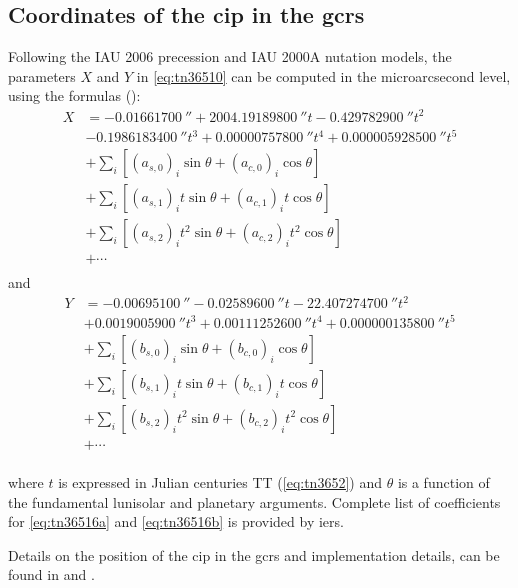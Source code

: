 \subsection{Coordinates of the \gls{cip} in the \gls{gcrs}}
\label{ssec:coordinates-of-the-cip-in-the-gcrs}
Following the IAU 2006 precession and IAU 2000A nutation models, the parameters 
\(X\) and \(Y\) in \ref{eq:tn36510} can be computed in the microarcsecond level, 
using the formulas (\cite{iers2010}):
\begin{equation}
  \label{eq:tn36516a}
  \begin{aligned}
  X &= \SI{-0.01661700}{\arcsecond} + \SI{2004.19189800}{\arcsecond} t - \SI{0.429782900}{\arcsecond} t^2 \\
  &- \SI{0.1986183400}{\arcsecond}t^3 + \SI{0.00000757800}{\arcsecond} t^4 + \SI{0.000005928500}{\arcsecond} t^5 \\
  &+ \sum_{i} \left[ (a_{s,0})_i \sin \theta + (a_{c,0})_i \cos \theta \right] \\ 
  &+ \sum_{i} \left[ (a_{s,1})_i t \sin \theta + (a_{c,1})_i t \cos \theta \right] \\ 
  &+ \sum_{i} \left[ (a_{s,2})_i t^2 \sin \theta + (a_{c,2})_i t^2 \cos \theta \right] \\ 
  &+ \cdots \\
  \end{aligned}
\end{equation}
and
\begin{equation}
  \label{eq:tn36516b}
  \begin{aligned}
  Y &= -\SI{0.00695100}{\arcsecond} - \SI{0.02589600}{\arcsecond} t - \SI{22.407274700}{\arcsecond} t^2 \\
  &+ \SI{0.0019005900}{\arcsecond} t^3 + \SI{0.00111252600}{\arcsecond} t^4 + \SI{0.000000135800}{\arcsecond} t^5 \\
  &+ \sum_{i} \left[ (b_{s,0})_i \sin \theta     + (b_{c,0})_i \cos \theta \right] \\ 
  &+ \sum_{i} \left[ (b_{s,1})_i t \sin \theta   + (b_{c,1})_i t \cos \theta \right] \\ 
  &+ \sum_{i} \left[ (b_{s,2})_i t^2 \sin \theta + (b_{c,2})_i t^2 \cos \theta \right] \\ 
  &+ \cdots \\
  \end{aligned}
\end{equation}

where \(t\) is expressed in Julian centuries TT (\ref{eq:tn3652}) and \(\theta\) 
is a function of the fundamental lunisolar and planetary arguments. Complete 
list of coefficients for \ref{eq:tn36516a} and \ref{eq:tn36516b} is provided 
by \gls{iers}. 

Details on the position of the \gls{cip} in the \gls{gcrs} and implementation 
details, can be found in \cite{CapitaineAndWallace2006} and 
\cite{Capitaineetal2003a}.

